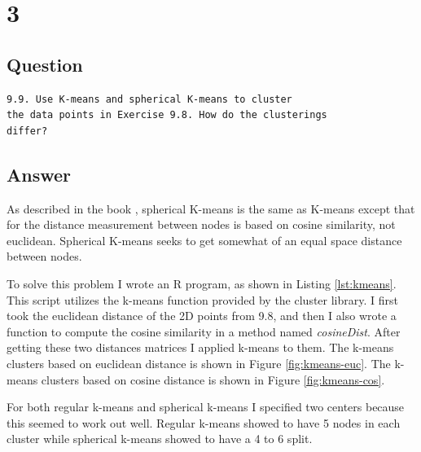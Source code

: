 \documentclass[letterpaper,11pt]{article}
\newcommand*{\srcPath}{../src}%
\begin{document}
% 

\clearpage


\section*{3}

\subsection*{Question}

\begin{verbatim}
9.9. Use K-means and spherical K-means to cluster 
the data points in Exercise 9.8. How do the clusterings 
differ?
\end{verbatim}

\subsection*{Answer}

As described in the book \cite{book}, spherical K-means is the same as K-means except that for the distance measurement between nodes is based on cosine similarity, not euclidean.
Spherical K-means seeks to get somewhat of an equal space distance between nodes.

To solve this problem I wrote an R program, as shown in Listing \ref{lst:kmeans}. 
This script utilizes the k-means function provided by the cluster library.
I first took the euclidean distance of the 2D points from 9.8, and then I also wrote a function to compute the cosine similarity in a method named \textit{cosineDist}.
After getting these two distances matrices I applied k-means to them.
The k-means clusters based on euclidean distance is shown in Figure \ref{fig:kmeans-euc}.
The k-means clusters based on cosine distance is shown in Figure \ref{fig:kmeans-cos}.

For both regular k-means and spherical k-means I specified two centers because this seemed to work out well.
Regular k-means showed to have 5 nodes in each cluster while spherical k-means showed to have a 4 to 6 split.

 
\end{document}
